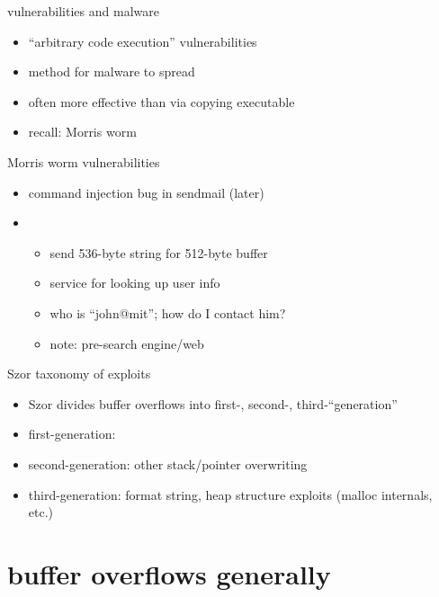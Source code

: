 \begin{frame}{vulnerabilities and malware}
    \begin{itemize}
    \item ``arbitrary code execution'' vulnerabilities
    \item method for malware to spread 
    \item often more effective than via copying executable
    \vspace{.5cm}
    \item<2> recall: Morris worm
    \end{itemize}
\end{frame}

\begin{frame}{Morris worm vulnerabilities}
    \begin{itemize}
    \item command injection bug in sendmail (later)
    \item {}
        \begin{itemize}
        \item send 536-byte string for 512-byte buffer
        \item service for looking up user info
        \item who is ``john@mit''; how do I contact him?
        \item note: pre-search engine/web
        \end{itemize}
    \end{itemize}
\end{frame}

\begin{frame}{Szor taxonomy of exploits}
    \begin{itemize}
    \item Szor divides buffer overflows into first-, second-, third-``generation''
    \item first-generation: 
    \item second-generation: other stack/pointer overwriting
    \item third-generation: format string, heap structure exploits (malloc internals, etc.)
    \end{itemize}
\end{frame}

\section{buffer overflows generally}

